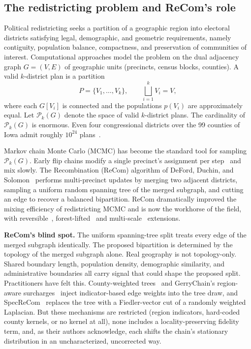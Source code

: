 \documentclass[11pt]{article}
\begin{document}
\subsection{The redistricting problem and ReCom's role}\label{sec:intro-problem}

Political redistricting seeks a partition of a geographic region into
electoral districts satisfying legal, demographic, and geometric
requirements, namely contiguity, population balance, compactness, and
preservation of communities of interest. Computational approaches model
the problem on the dual adjacency graph $G = (V,E)$ of geographic units
(precincts, census blocks, counties). A valid $k$-district plan is a
partition
\[
  P = \{V_1, \ldots, V_k\}, \qquad \bigsqcup_{i=1}^k V_i = V,
\]
where each $G[V_i]$ is connected and the populations $p(V_i)$ are
approximately equal. Let $\mathcal{P}_k(G)$ denote the space of valid
$k$-district plans. The cardinality of $\mathcal{P}_k(G)$ is enormous.
Even four congressional districts over the 99 counties of Iowa admit
roughly $10^{24}$ plans~\cite{fifield2020essential}.

Markov chain Monte Carlo (MCMC) has become the standard tool for
sampling $\mathcal{P}_k(G)$. Early flip chains modify a single
precinct's assignment per step~\cite{fifield2020automated} and mix
slowly. The Recombination (ReCom) algorithm of DeFord, Duchin, and
Solomon~\cite{deford2021recombination} performs multi-precinct updates
by merging two adjacent districts, sampling a uniform random spanning
tree of the merged subgraph, and cutting an edge to recover a balanced
bipartition. ReCom dramatically improved the mixing efficiency of
redistricting MCMC and is now the workhorse of the field, with
reversible~\cite{cannon2022spanning}, forest-lifted~\cite{autry2023metropolized}
and multi-scale~\cite{autry2020multiscale} extensions.

\textbf{ReCom's blind spot.} The uniform spanning-tree split treats
every edge of the merged subgraph identically. The proposed
bipartition is determined by the topology of the merged subgraph
alone. Real geography is not topology-only. Shared boundary
length, population density, demographic similarity, and
administrative boundaries all carry signal that could shape the
proposed split. Practitioners have felt this. County-weighted
trees~\cite{clelland2022colorado} and GerryChain's region-aware
surcharges~\cite{gerrychain2024} inject indicator-based edge weights
into the tree draw, and SpecReCom~\cite{davies2025spectral} replaces
the tree with a Fiedler-vector cut of a randomly weighted Laplacian.
But these mechanisms are restricted (region indicators, hard-coded
county kernels, or no kernel at all), none includes a
locality-preserving fidelity term, and, as their authors
acknowledge, each shifts the chain's stationary distribution in
an uncharacterized, uncorrected way.
\end{document}

